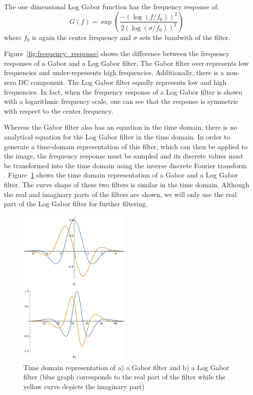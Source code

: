 \documentclass[journal]{IEEEtran}
\begin{document}
The one dimensional Log Gabor function has the frequency response of:
\[
	G(f) = \exp\left( \frac{-(\log(f/f_0))^2}{2(\log(\sigma/f_0))^2}\right)
\]
where $f_0$ is again the center frequency and $\sigma$ sets the bandwith of the filter.

Figure~\ref{fig:frequency_response} shows the difference between the frequency responses of a Gabor and a Log Gabor filter. The Gabor filter over-represents low frequencies and under-represents high frequencies. Additionally, there is a non-zero DC component. The Log Gabor filter equally represents low and high frequencies. In fact, when the frequency response of a Log Gabor filter is shown with a logarithmic frequency scale, one can see that the response is symmetric with respect to the center frequency.

Whereas the Gabor filter also has an equation in the time domain, there is no analytical equation for the Log Gabor filter in the time domain. In order to generate a time-domain representation of this filter, which can then be applied to the image, the frequency response must be sampled and its discrete values must be transformed into the time domain using the inverse discrete Fourier transform \cite{loggabores}. Figure~\ref{fig:impulse_response} shows the time domain representation of a Gabor and a Log Gabor filter. The curve shape of these two filters is similar in the time domain. Although the real and imaginary parts of the filters are shown, we will only use the real part of the Log Gabor filter for further filtering.

\begin{figure}[t]
\centering
  \includegraphics[width=0.49\textwidth]{iris/impulse_response}
	\caption{Time domain representation of a) a Gabor filter and b) a Log Gabor filter (blue graph corresponds to the real part of the filter while the yellow curve depicts the imaginary part)}
	\label{fig:impulse_response}
\end{figure}
\end{document}

